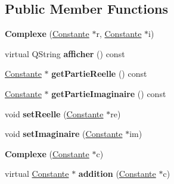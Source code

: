 \subsection*{\-Public \-Member \-Functions}
\begin{DoxyCompactItemize}
\item 
\hypertarget{class_complexe_ae19286bc2c8f360e3fbc0d65526564d3}{{\bfseries \-Complexe} (\hyperlink{class_constante}{\-Constante} $\ast$r, \hyperlink{class_constante}{\-Constante} $\ast$i)}\label{class_complexe_ae19286bc2c8f360e3fbc0d65526564d3}

\item 
\hypertarget{class_complexe_a5141b5b092f78c06f60013e911ba4440}{virtual \-Q\-String {\bfseries afficher} () const }\label{class_complexe_a5141b5b092f78c06f60013e911ba4440}

\item 
\hypertarget{class_complexe_a4441d56fc9776ce78efd8b5d95d9170b}{\hyperlink{class_constante}{\-Constante} $\ast$ {\bfseries get\-Partie\-Reelle} () const }\label{class_complexe_a4441d56fc9776ce78efd8b5d95d9170b}

\item 
\hypertarget{class_complexe_a9e3e38b5362dd83812da9235594d1fcc}{\hyperlink{class_constante}{\-Constante} $\ast$ {\bfseries get\-Partie\-Imaginaire} () const }\label{class_complexe_a9e3e38b5362dd83812da9235594d1fcc}

\item 
\hypertarget{class_complexe_a7e57ea7cf760e132c80a148e2c344cce}{void {\bfseries set\-Reelle} (\hyperlink{class_constante}{\-Constante} $\ast$re)}\label{class_complexe_a7e57ea7cf760e132c80a148e2c344cce}

\item 
\hypertarget{class_complexe_a2335ce4c53e2b11d4fa4bcbef45415ba}{void {\bfseries set\-Imaginaire} (\hyperlink{class_constante}{\-Constante} $\ast$im)}\label{class_complexe_a2335ce4c53e2b11d4fa4bcbef45415ba}

\item 
\hypertarget{class_complexe_ac00d0b5ba1dea7d67c43d257e48fd7b5}{{\bfseries \-Complexe} (\hyperlink{class_constante}{\-Constante} $\ast$c)}\label{class_complexe_ac00d0b5ba1dea7d67c43d257e48fd7b5}

\item 
\hypertarget{class_complexe_adb3491a51a6b76d8e2c41ab87e519003}{virtual \hyperlink{class_constante}{\-Constante} $\ast$ {\bfseries addition} (\hyperlink{class_constante}{\-Constante} $\ast$c)}\label{class_complexe_adb3491a51a6b76d8e2c41ab87e519003}


\end{DoxyCompactItemize}
